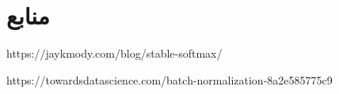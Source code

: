 \documentclass{article}
\begin{document}







\section*{منابع}
\renewcommand{\section}[2]{}%
\begin{thebibliography}{99} %


\begin{LTRitems}

\resetlatinfont

 https://jaykmody.com/blog/stable-softmax/

 https://towardsdatascience.com/batch-normalization-8a2e585775c9

\end{LTRitems}

\end{thebibliography}
\end{document}
